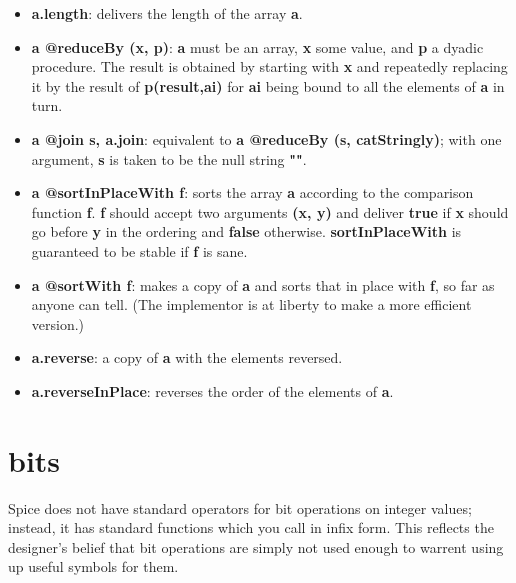 \documentclass{report}
\begin{document}
\begin{itemize}\item {\bf a.length}: delivers the length of the array {\bf a}.

\item {\bf a @reduceBy (x, p)}: {\bf a} must be an array, {\bf x} some value, and {\bf p} a dyadic
procedure. The result is obtained by starting with {\bf x} and repeatedly
replacing it by the result of {\bf p(result,ai)} for {\bf ai} being bound to all the
elements of {\bf a} in turn.

\item {\bf a @join s, a.join}: equivalent to {\bf a @reduceBy (s, catStringly)}; with one
argument, {\bf s} is taken to be the null string {\bf ""}.

\item {\bf a @sortInPlaceWith f}: sorts the array {\bf a} according to the comparison
function {\bf f}. {\bf f} should accept two arguments {\bf (x, y)} and deliver
{\bf true} if {\bf x} should go before {\bf y} in the ordering and {\bf false}
otherwise. {\bf sortInPlaceWith} is guaranteed to be stable if {\bf f} is
sane.

\item {\bf a @sortWith f}: makes a copy of {\bf a} and sorts that in place with {\bf f},
so far as anyone can tell. (The implementor is at liberty to make a
more efficient version.)

\item {\bf a.reverse}: a copy of {\bf a} with the elements reversed.

\item {\bf a.reverseInPlace}: reverses the order of the elements of {\bf a}.

\end{itemize}

\section{bits}


Spice does not have standard operators for bit operations on integer values;
instead, it has standard functions which you call in infix form. This reflects
the designer's belief that bit operations are simply not used enough to
warrent using up useful symbols for them.
\end{document}
